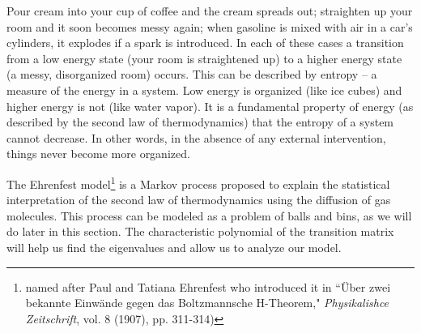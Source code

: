  \label{sec:characteristic_equation}

\vspace*{-17 pt}

\vspace*{13 pt}


Pour cream into your cup of coffee and the cream spreads out; straighten up your room and it soon becomes messy again; when gasoline is mixed with air in a car's cylinders, it explodes if a spark is introduced. In each of these cases a transition from a low energy state (your room is straightened up) to a higher energy state (a messy, disorganized room) occurs. This can be described by entropy -- a measure of the energy in a system. Low energy is organized (like ice cubes) and higher energy is not (like water vapor). It is a fundamental property of energy (as described by the second law of thermodynamics) that the entropy of a system cannot decrease. In other words, in the absence of any external intervention, things never become more organized.

The Ehrenfest model\footnote{named after Paul and Tatiana Ehrenfest who introduced it in ``{\"U}ber zwei bekannte Einw{\"a}nde gegen das Boltzmannsche H-Theorem," \emph{Physikalishce Zeitschrift}, vol. 8 (1907), pp. 311-314)} is a Markov process proposed to explain the statistical interpretation of the second law of thermodynamics using the diffusion of gas molecules. This process can be modeled as a problem of balls and bins, as we will do later in this section. The characteristic polynomial of the transition matrix will help us find the eigenvalues and allow us to analyze our model. 


